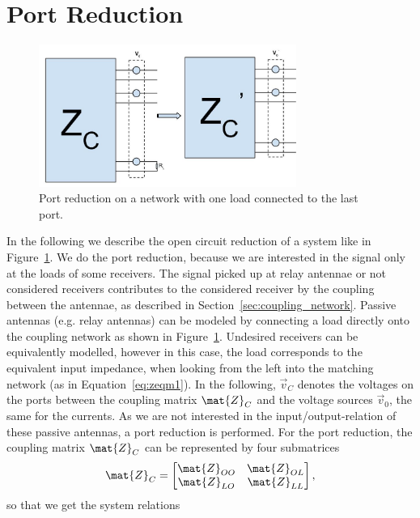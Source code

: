 \section{Port Reduction}
\label{sec:port_reduction}

\begin{figure}
\begin{center}
\includegraphics[width=0.75\textwidth]{images/Port_reduction.jpg}
\caption{Port reduction on a network with one load connected to the last port.}
\label{fig:port_reduction}
\end{center}
\end{figure}
In the following we describe the open circuit reduction of a system like in Figure~\ref{fig:port_reduction}.
We do the port reduction, because we are interested in the signal only at the loads of some receivers.
The signal picked up at relay antennae or not considered receivers contributes to the considered receiver by the coupling between the antennae, as described in Section~\ref{sec:coupling_network}.
Passive antennas (e.g. relay antennas) can be modeled by connecting a load directly onto the coupling network as shown in Figure~\ref{fig:port_reduction}.
Undesired receivers can be equivalently modelled, however in this case, the load corresponds to the equivalent input impedance, when looking from the left into the matching network (as in Equation~\eqref{eq:zeqm1}).
In the following, $\vec{v}_C$ denotes the voltages on the ports between the coupling matrix $\mat{Z}_C$ and the voltage sources $\vec{v}_0$, the same for the currents.
As we are not interested in the input/output-relation of these passive antennas, a port reduction is performed.
For the port reduction, the coupling matrix $\mat{Z}_C$ can be represented by four submatrices
\begin{equation}
\mat{Z}_C=
\begin{bmatrix}
\mat{Z}_{OO} & \mat{Z}_{OL}\\
\mat{Z}_{LO} & \mat{Z}_{LL}
\end{bmatrix},
\end{equation}
so that we get the system relations

